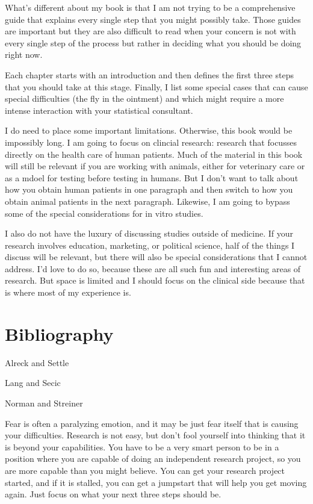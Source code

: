 \documentclass[
  letterpaper,
  DIV=11,
  numbers=noendperiod]{scrreprt}
\begin{document}
What's different about my book is that I am not trying to be a
comprehensive guide that explains every single step that you might
possibly take. Those guides are important but they are also difficult to
read when your concern is not with every single step of the process but
rather in deciding what you should be doing right now.

Each chapter starts with an introduction and then defines the first
three steps that you should take at this stage. Finally, I list some
special cases that can cause special difficulties (the fly in the
ointment) and which might require a more intense interaction with your
statistical consultant.

I do need to place some important limitations. Otherwise, this book
would be impossibly long. I am going to focus on clincial research:
research that focusses directly on the health care of human patients.
Much of the material in this book will still be relevant if you are
working with animals, either for veterinary care or as a mdoel for
testing before testing in humans. But I don't want to talk about how you
obtain human patients in one paragraph and then switch to how you obtain
animal patients in the next paragraph. Likewise, I am going to bypass
some of the special considerations for in vitro studies.

I also do not have the luxury of discussing studies outside of medicine.
If your research involves education, marketing, or political science,
half of the things I discuss will be relevant, but there will also be
special considerations that I cannot address. I'd love to do so, because
these are all such fun and interesting areas of research. But space is
limited and I should focus on the clinical side because that is where
most of my experience is.

\section{Bibliography}\label{bibliography}

Alreck and Settle

Lang and Secic

Norman and Streiner

Fear is often a paralyzing emotion, and it may be just fear itself that
is causing your difficulties. Research is not easy, but don't fool
yourself into thinking that it is beyond your capabilities. You have to
be a very smart person to be in a position where you are capable of
doing an independent research project, so you are more capable than you
might believe. You can get your research project started, and if it is
stalled, you can get a jumpstart that will help you get moving again.
Just focus on what your next three steps should be.
\end{document}
